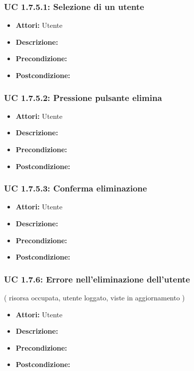 \subsubsection{UC 1.7.5.1: Selezione di un utente}

\begin{itemize}
\item \textbf{Attori:} Utente
\item \textbf{Descrizione:} 
\item \textbf{Precondizione:} 
\item \textbf{Postcondizione:} 
\end{itemize}

\subsubsection{UC 1.7.5.2: Pressione pulsante elimina}

\begin{itemize}
\item \textbf{Attori:} Utente
\item \textbf{Descrizione:} 
\item \textbf{Precondizione:} 
\item \textbf{Postcondizione:} 
\end{itemize}

\subsubsection{UC 1.7.5.3: Conferma eliminazione}

\begin{itemize}
\item \textbf{Attori:} Utente
\item \textbf{Descrizione:} 
\item \textbf{Precondizione:} 
\item \textbf{Postcondizione:} 
\end{itemize}

\subsubsection{UC 1.7.6: Errore nell’eliminazione dell'utente}
( risorsa occupata, utente loggato, viste in aggiornamento )

\begin{itemize}
\item \textbf{Attori:} Utente
\item \textbf{Descrizione:} 
\item \textbf{Precondizione:} 
\item \textbf{Postcondizione:} 
\end{itemize}





